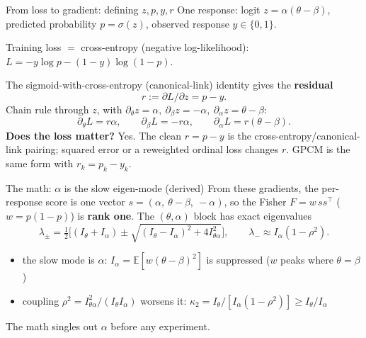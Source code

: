 \documentclass[aspectratio=169]{beamer}
\begin{document}
\begin{frame}{From loss to gradient: defining $z,p,y,r$}
One response: logit $z=\alpha(\theta-\beta)$, predicted probability $p=\sigma(z)$, observed response $y\in\{0,1\}$.
\medskip

Training loss $=$ cross-entropy (negative log-likelihood): \ $L=-y\log p-(1-y)\log(1-p)$.

The sigmoid-with-cross-entropy (canonical-link) identity gives the \textbf{residual}
\[ r:=\partial L/\partial z=p-y. \]
Chain rule through $z$, with $\partial_\theta z=\alpha,\ \partial_\beta z=-\alpha,\ \partial_\alpha z=\theta-\beta$:
\[ \partial_\theta L=r\alpha,\qquad \partial_\beta L=-r\alpha,\qquad \partial_\alpha L=r(\theta-\beta). \]
\footnotesize\textbf{Does the loss matter?} Yes. The clean $r=p-y$ is the cross-entropy/canonical-link pairing; squared error or a reweighted ordinal loss changes $r$. GPCM is the same form with $r_k=p_k-y_k$.
\end{frame}

\begin{frame}{The math: $\alpha$ is the slow eigen-mode (derived)}
From these gradients, the per-response score is one vector $s=(\alpha,\ \theta-\beta,\ -\alpha)$, so the Fisher
$F=w\,ss^\top$ ($w=p(1{-}p)$) is \textbf{rank one}. The $(\theta,\alpha)$ block has exact eigenvalues
\[ \lambda_\pm=\tfrac12\big[(I_\theta{+}I_\alpha)\pm\sqrt{(I_\theta{-}I_\alpha)^2+4I_{\theta\alpha}^2}\big],
   \qquad \lambda_-\approx I_\alpha(1-\rho^2). \]
\begin{itemize}
\item the slow mode is $\alpha$: $I_\alpha=\mathbb{E}[w(\theta-\beta)^2]$ is suppressed ($w$ peaks where $\theta{=}\beta$)
\item coupling $\rho^2=I_{\theta\alpha}^2/(I_\theta I_\alpha)$ worsens it: $\kappa_2=I_\theta/[I_\alpha(1-\rho^2)]\ge I_\theta/I_\alpha$
\end{itemize}
\centering The math singles out $\alpha$ before any experiment.
\end{frame}
\end{document}
